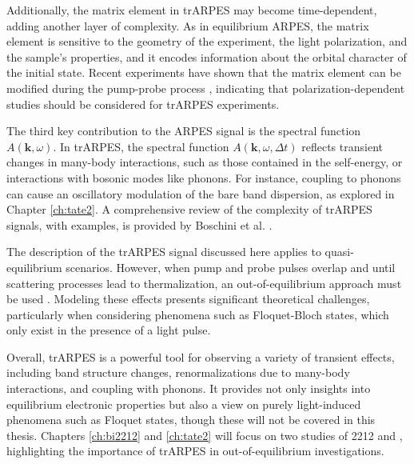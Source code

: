 Additionally, the matrix element in trARPES may become time-dependent, adding another layer of complexity.
As in equilibrium ARPES, the matrix element is sensitive to the geometry of the experiment, the light polarization, and the sample's properties, and it encodes information about the orbital character of the initial state.
Recent experiments have shown that the matrix element can be modified during the pump-probe process \cite{boschini_role_2020,freericks_constant_2016}, indicating that polarization-dependent studies should be considered for trARPES experiments.

The third key contribution to the ARPES signal is the spectral function $A(\mathbf{k}, \omega)$.
In trARPES, the spectral function $A(\mathbf{k}, \omega, \Delta t)$ reflects transient changes in many-body interactions, such as those contained in the self-energy, or interactions with bosonic modes like phonons.
For instance, coupling to phonons can cause an oscillatory modulation of the bare band dispersion, as explored in Chapter \ref{ch:tate2}.
A comprehensive review of the complexity of trARPES signals, with examples, is provided by Boschini et al. \cite{boschini_time-resolved_2024}.

The description of the trARPES signal discussed here applies to quasi-equilibrium scenarios.
However, when pump and probe pulses overlap and until scattering processes lead to thermalization, an out-of-equilibrium approach must be used \cite{schuler_theory_2021, freericks_what_2021, neufeld_time-_2022}.
Modeling these effects presents significant theoretical challenges, particularly when considering phenomena such as Floquet-Bloch states, which only exist in the presence of a light pulse.

Overall, trARPES is a powerful tool for observing a variety of transient effects, including band structure changes, renormalizations due to many-body interactions, and coupling with phonons.
It provides not only insights into equilibrium electronic properties but also a view on purely light-induced phenomena such as Floquet states, though these will not be covered in this thesis.
Chapters \ref{ch:bi2212} and \ref{ch:tate2} will focus on two studies of 2212 and , highlighting the importance of trARPES in out-of-equilibrium investigations.